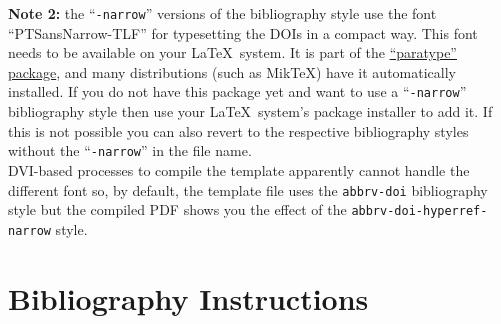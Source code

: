 \documentclass[review]{vgtc}                 %
\begin{document}
\begin{itemize}
\textbf{Note 2:} the ``\texttt{-narrow}'' versions of the bibliography style use the font ``PTSansNarrow-TLF'' for typesetting the DOIs in a compact way. This font needs to be available on your \LaTeX\ system. It is part of the \href{https://www.ctan.org/pkg/paratype}{``paratype'' package}, and many distributions (such as MikTeX) have it automatically installed. If you do not have this package yet and want to use a ``\texttt{-narrow}'' bibliography style then use your \LaTeX\ system's package installer to add it. If this is not possible you can also revert to the respective bibliography styles without the ``\texttt{-narrow}'' in the file name.\\[1em]
DVI-based processes to compile the template apparently cannot handle the different font so, by default, the template file uses the \texttt{abbrv-doi} bibliography style but the compiled PDF shows you the effect of the \texttt{abbrv-doi-hyperref-narrow} style.
\end{itemize}

\section{Bibliography Instructions}
\end{document}
